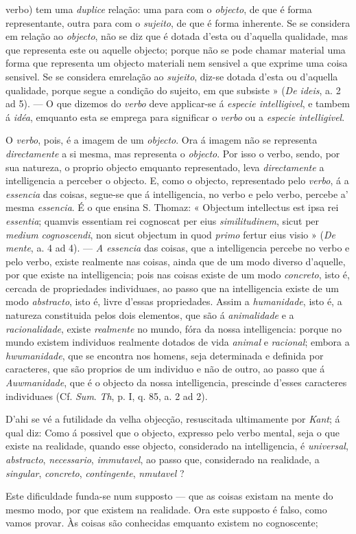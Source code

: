 verbo) tem uma \emph{duplice} relação: uma para com o \emph{objecto}, de que é forma representante, outra para com o \emph{sujeito}, de que é forma inherente. Se se considera em relação ao \emph{objecto}, não se diz que é dotada d'esta ou d'aquella qualidade, mas que representa este ou aquelle objecto; porque não se pode chamar material uma forma que representa um objecto materiali nem sensivel a que exprime uma coisa sensivel. Se se considera emrelação ao \emph{sujeito}, diz-se dotada d'esta ou d'aquella qualidade, porque segue a condição do sujeito, em que subsiste » (\emph{De ideis}, a. 2 ad 5). --- O que dizemos do \emph{verbo} deve applicar-se á \emph{especie intelligivel}, e tambem á \emph{idéa}, emquanto esta se emprega para significar o \emph{verbo} ou a \emph{especie intelligivel}.\par O \emph{verbo}, pois, é a imagem de um \emph{objecto}. Ora á imagem não se representa \emph{directamente} a si mesma, mas representa o \emph{objecto}. Por isso o verbo, sendo, por sua natureza, o proprio objecto emquanto representado, leva \emph{directamente} a intelligencia a perceber o objecto. E, como o objecto, representado pelo \emph{verbo}, á a \emph{essencia} das coisas, segue-se que á intelligencia, no verbo e pelo verbo, percebe a' mesma \emph{essencia}. É o que ensina S. Thomaz: « Objectum intellectus est ipsa rei \emph{essentia}; quamvis essentiam rei cognoscat per eius \emph{similitudinem}, sicut per \emph{medium cognoscendi}, non sicut objectum in quod \emph{primo} fertur eius visio » (\emph{De mente}, a. 4 ad 4). --- \emph{A essencia} das coisas, que a intelligencia percebe no verbo e pelo verbo, existe realmente nas coisas, ainda que de um modo diverso d'aquelle, por que existe na intelligencia; pois nas coisas existe de um modo \emph{concreto}, isto é, cercada de propriedades individuaes, ao passo que na intelligencia existe de um modo \emph{abstracto}, isto é, livre d'essas propriedades. Assim a \emph{humanidade}, isto é, a natureza constituida pelos dois elementos, que são á \emph{animalidade} e a \emph{racionalidade}, existe \emph{realmente} no mundo, fóra da nossa intelligencia: porque no mundo existem individuos realmente dotados de vida \emph{animal} e \emph{racional}; embora a \emph{hwumanidade}, que se encontra nos homens, seja determinada e definida por caracteres, que são proprios de um individuo e não de outro, ao passo que á \emph{Auwmanidade}, que é o objecto da nossa intelligencia, prescinde d'esses caracteres individuaes (Cf. \emph{Sum}. \emph{Th}, p. I, q. 85, a. 2 ad 2).\par D'ahi se vé a futilidade da velha objecção, resuscitada ultimamente por \emph{Kant}; á qual diz: Como á possivel que o objecto, expresso pelo verbo mental, seja o que existe na realidade, quando esse objecto, considerado na intelligencia, é \emph{universal}, \emph{abstracto}, \emph{necessario}, \emph{immutavel}, ao passo que, considerado na realidade, a \emph{singular}, \emph{concreto}, \emph{contingente}, \emph{nmutavel} ?\par Este dificuldade funda-se num supposto --- que as coisas existam na mente do mesmo modo, por que existem na realidade. Ora este supposto é falso, como vamos provar. Às coisas são conhecidas emquanto existem no cognoscente; 